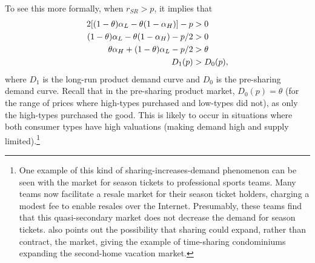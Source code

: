 \documentclass[11pt]{article}
\begin{document}
To see this more formally, when $r_{SR} > p$, it implies that
\begin{align}
 2[(1- \theta) \alpha_L - \theta(1 - \alpha_H)] - p &> 0 \notag \\
(1- \theta) \alpha_L - \theta(1 - \alpha_H) - p/2 &> 0 \notag \\
\theta \alpha_H + (1- \theta) \alpha_L - p/2 &> \theta \notag \\
 D_{1}(p) & > D_{0}(p), \notag \\
\end{align}
where $D_{1}$ is the long-run product demand curve and $D_{0}$ is the pre-sharing demand curve.
Recall that in the pre-sharing product market, $D_0(p) = \theta$ (for the range of prices where high-types purchased and low-types did not), as only the high-types purchased the good. 
This is likely to occur in situations where both consumer types have high valuations (making demand high and supply limited).\footnote{ 
  One example of this kind of sharing-increases-demand phenomenon can be seen with the market for season tickets to professional sports teams.
  Many teams now facilitate a resale market for their season ticket holders, charging a modest fee to enable resales over the Internet.
  Presumably, these teams find that this quasi-secondary market does not decrease the demand for season tickets.
  \cite{belk2014you} also points out the possibility that sharing could expand, rather than contract, the market, giving the example of time-sharing condominiums expanding the second-home vacation market. 
}

\end{document}
